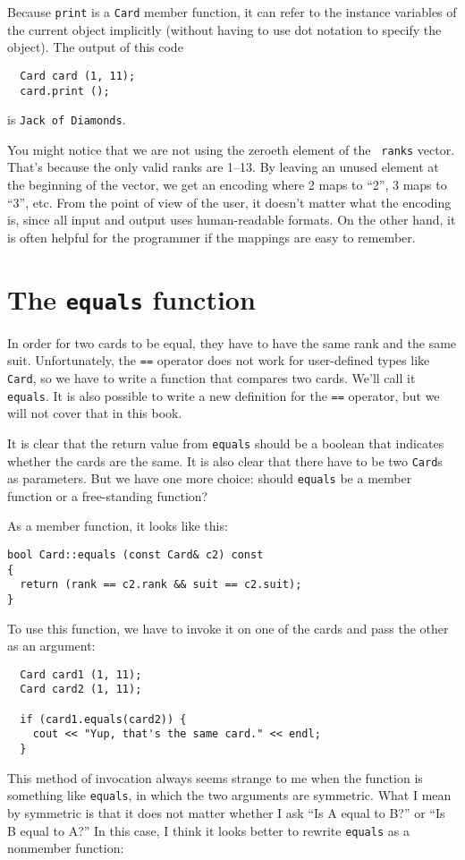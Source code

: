 Because {\tt print} is a {\tt Card} member function,
it can refer to the instance variables of the current object
implicitly (without having to use dot notation to specify the
object).  The output of this code

\begin{lstlisting}
  Card card (1, 11);
  card.print ();
\end{lstlisting}
%
is {\tt Jack of Diamonds}.

You might notice that we are not using the zeroeth element of the {\tt
ranks} vector.  That's because the only valid ranks are 1--13.  By
leaving an unused element at the beginning of the vector, we get an
encoding where 2 maps to ``2'', 3 maps to ``3'', etc.  From the point
of view of the user, it doesn't matter what the encoding is, since all
input and output uses human-readable formats.  On the other hand, it
is often helpful for the programmer if the mappings are easy
to remember.

\section{The {\tt equals} function}

In order for two cards to be equal, they have to have the same rank
and the same suit.  Unfortunately, the {\tt ==} operator does not work
for user-defined types like {\tt Card}, so we have to write a function
that compares two cards.  We'll call it {\tt equals}.  It is also
possible to write a new definition for the {\tt ==} operator, but we
will not cover that in this book.

It is clear that the return value from {\tt equals} should be a
boolean that indicates whether the cards are the same.  It is
also clear that there have to be two {\tt Card}s as parameters.
But we have one more choice: should {\tt equals} be a member
function or a free-standing function?

As a member function, it looks like this:

\begin{lstlisting}
bool Card::equals (const Card& c2) const
{
  return (rank == c2.rank && suit == c2.suit);
}
\end{lstlisting}
%
To use this function, we have to invoke it on one of the
cards and pass the other as an argument:

\begin{lstlisting}
  Card card1 (1, 11);
  Card card2 (1, 11);

  if (card1.equals(card2)) {
    cout << "Yup, that's the same card." << endl;
  }
\end{lstlisting}
%
This method of invocation always seems strange to me when the
function is something like {\tt equals}, in which the two
arguments are symmetric.  What I mean by symmetric is that it
does not matter whether I ask ``Is A equal to B?'' or
``Is B equal to A?''  In this case, I think it looks better to rewrite
{\tt equals} as a nonmember function:

